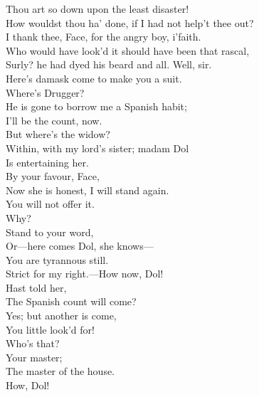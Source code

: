 \documentclass[a4paper,oneside]{memoir}
\begin{document}
\begin{drama*}
Thou art so down upon the least disaster!\\
How wouldst thou ha' done, if I had not help't thee out?\\
\subtlespeaks I thank thee, Face, for the angry boy, i'faith.\\
\facespeaks Who would have look'd it should have been that rascal,\\
Surly? he had dyed his beard and all. Well, sir.\\
Here's damask come to make you a suit.\\
\subtlespeaks {} Where's Drugger?\\
\facespeaks He is gone to borrow me a Spanish habit;\\
I'll be the count, now.\\
\subtlespeaks {} But where's the widow?\\
\facespeaks Within, with my lord's sister; madam Dol\\
Is entertaining her.\\
\subtlespeaks {} By your favour, Face,\\
Now she is honest, I will stand again.\\
\facespeaks You will not offer it.\\
\subtlespeaks {} Why?\\
\facespeaks {} Stand to your word,\\
Or---here comes Dol, she knows---\\
\subtlespeaks {} You are tyrannous still.\\
\facespeaks Strict for my right.---How now, Dol!\\
Hast  told her,\\
The Spanish count will come?\\
\dolspeaks {} Yes; but another is come,\\
You little look'd for!\\
\facespeaks {} Who's that?\\
\dolspeaks {} Your master;\\
The master of the house.\\
\subtlespeaks {} How, Dol!\\

\end{drama*}
\end{document}
